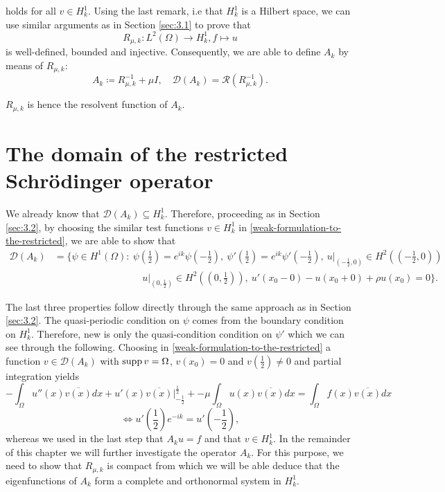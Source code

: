 holds for all $v \in H^{1}_{k}$. Using the last remark, i.e that $H^{1}_{k}$ is a Hilbert space, we can use similar arguments as in Section \ref{sec:3.1} to prove that 
	\[ R_{\mu, k} \colon L^{2}(\Omega) \rightarrow H^{1}_{k},  f \mapsto u \]
is well-defined, bounded and injective. Consequently, we are able to define $A_{k}$ by means of $R_{\mu, k}$:
	\[ A_{k} \coloneqq R_{\mu, k}^{-1} + \mu I, \quad \mathcal{D}(A_{k}) = \mathcal{R}(R_{\mu, k}^{-1}). \] 
	
\begin{remark}
	$R_{\mu, k}$ is hence the resolvent function of $A_{k}$.
\end{remark}

\section{The domain of the restricted Schrödinger operator} \label{sec:4.1}

We already know that $\mathcal{D}(A_{k}) \subseteq H^{1}_{k}$. Therefore, proceeding as in Section \ref{sec:3.2}, by choosing the similar test functions $v \in H^{1}_{k}$ in \eqref{weak-formulation-to-the-restricted}, we are able to show that
\begin{align*}
	\mathcal{D}(A_{k}) & = \Big\{ \psi \in H^{1}(\Omega) \colon ~\psi\left(\frac{1}{2}\right) = e^{ik} \psi\left(-\frac{1}{2}\right), ~ \psi'\left(\frac{1}{2}\right) = e^{ik} \psi'\left(-\frac{1}{2}\right), ~ u\big|_{\left(-\frac{1}{2}, 0\right)} \in H^{2}\left(\left(-\frac{1}{2}, 0\right)\right) \\	
	 & ~\qquad ~\qquad ~\qquad ~\qquad ~ u\big|_{\left(0, \frac{1}{2}\right)} \in H^{2}\left(\left(0, \frac{1}{2}\right)\right), ~ u'(x_{0}-0) - u(x_{0} + 0) + \rho u(x_{0}) = 0 \Big\}. 
\end{align*}

The last three properties follow directly through the same approach as in Section \ref{sec:3.2}. The quasi-periodic condition on $\psi$ comes from the boundary condition on $H^{1}_{k}$. Therefore, new is only the quasi-condition condition on $\psi'$ which we can see through the following. Choosing in \eqref{weak-formulation-to-the-restricted} a function $v \in \mathcal{D}(A_{k})$ with $\operatorname{supp} v = \Omega$, $v\left(x_{0}\right) = 0$ and $v\left(\frac{1}{2}\right) \neq 0$ and partial integration yields
\[ - \int_{\Omega} u''(x) \overline{v(x)} dx +  u'(x) \overline{v(x)} \big|_{-\frac{1}{2}}^{\frac{1}{2}} + - \mu \int_{\Omega} u(x) \overline{v(x)} dx = \int_{\Omega} f(x) \overline{v(x)} dx \] 
\[ \iff u'\left(\frac{1}{2}\right) e^{-ik} = u'\left(-\frac{1}{2}\right), \] 
whereas we used in the last step that $A_{k} u = f$ and that $v \in H^{1}_{k}$. In the remainder of this chapter we will further investigate the operator $A_{k}$. For this purpose, we need to show that $R_{\mu, k}$ is compact from which we will be able deduce that the eigenfunctions of $A_{k}$ form a complete and orthonormal system in $H^{1}_{k}$. %

